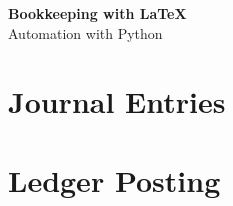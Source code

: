 \documentclass[a4paper, 10pt]{article}
\begin{document}
	
	\begin{center}
		{\bfseries\LARGE Bookkeeping with \LaTeX{}} \\ \medskip
		{\LARGE Automation with Python}
	\end{center}
	
	\section{Journal Entries}
	
	
	\section{Ledger Posting}
	
	
\end{document}

